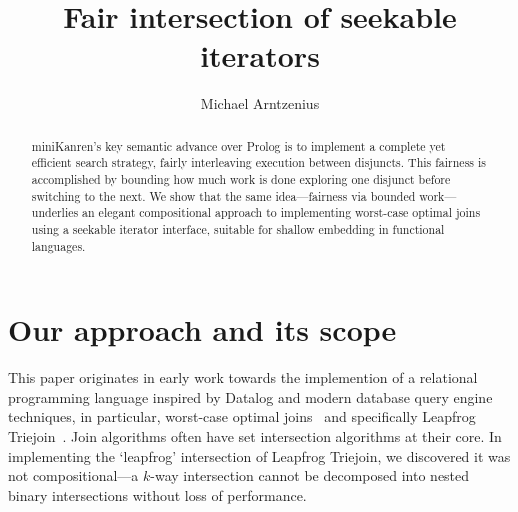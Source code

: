 \documentclass[acmsmall,screen,dvipsnames,svgnames]{acmart}
\title{Fair intersection of seekable iterators}
\author{Michael Arntzenius}
\affiliation{%
	\institution{UC Berkeley}
	\city{Berkeley}
	\state{CA}
	\country{USA}
}
\begin{document}
\begin{abstract}
  miniKanren's key semantic advance over Prolog is to implement a complete yet efficient search strategy, fairly interleaving execution between disjuncts.
  This fairness is accomplished by bounding how much work is done exploring one disjunct before switching to the next.
  We show that the same idea---fairness via bounded work---underlies an elegant compositional approach to implementing worst-case optimal joins using a seekable iterator interface, suitable for shallow embedding in functional languages.
\end{abstract}

\maketitle


\section{Our approach and its scope}


This paper originates in early work towards the implemention of a relational programming language inspired by Datalog and modern database query engine techniques, in particular, worst-case optimal joins~\citep{DBLP:conf/pods/NgoPRR12} and specifically Leapfrog Triejoin~\citep{lftj}.
%
Join algorithms often have set intersection algorithms at their core.
In implementing the `leapfrog' intersection of Leapfrog Triejoin, we discovered it was not compositional---a $k$-way intersection cannot be decomposed into nested binary intersections without loss of performance.
\end{document}
